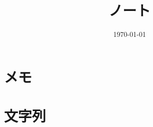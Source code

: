 \documentclass[6pt]{jreport}
\title{ノート}
\author{}
\date{\today}
\begin{document}
\maketitle
\tableofcontents

\chapter{メモ}

%
\chapter{文字列}

%
%
%
%
%
%
%
%
%



\end{document}
